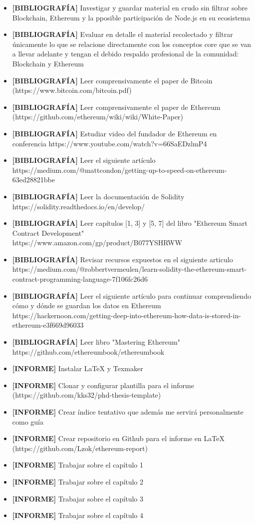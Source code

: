 \begin{itemize}
\item \textbf{[BIBLIOGRAFÍA]} Investigar y guardar material en crudo sin filtrar sobre Blockchain, Ethereum y la pposible participación de Node.js en su ecosistema
\item \textbf{[BIBLIOGRAFÍA]} Evaluar en detalle el material recolectado y filtrar únicamente lo
que se relacione directamente con los conceptos core que se van a llevar adelante y tengan el
debido respaldo profesional de la comunidad: Blockchain y Ethereum
\item \textbf{[BIBLIOGRAFÍA]} Leer comprensivamente el paper de Bitcoin 
(https://www.bitcoin.com/bitcoin.pdf)
\item \textbf{[BIBLIOGRAFÍA]} Leer comprensivamente el paper de Ethereum 
(https://github.com/ethereum/wiki/wiki/White-Paper)
\item \textbf{[BIBLIOGRAFÍA]} Estudiar video del fundador de Ethereum en conferencia 
https://www.youtube.com/watch?v=66SaEDzlmP4
\item \textbf{[BIBLIOGRAFÍA]} Leer el siguiente artículo 
https://medium.com/@mattcondon/getting-up-to-speed-on-ethereum-63ed28821bbe
\item \textbf{[BIBLIOGRAFÍA]} Leer la documentación de Solidity https://solidity.readthedocs.io/en/develop/
\item \textbf{[BIBLIOGRAFÍA]} Leer capítulos [1, 3] y [5, 7] del libro "Ethereum Smart Contract Development" https://www.amazon.com/gp/product/B077YSHRWW
\item \textbf{[BIBLIOGRAFÍA]} Revisar recursos expuestos en el siguiente articulo 
https://medium.com/@robbertvermeulen/learn-solidity-the-ethereum-smart-contract-programming-language-7f106fc26d6
\item \textbf{[BIBLIOGRAFÍA]} Leer el siguiente artículo para continuar comprendiendo cómo y dónde
se guardan los datos en Ethereum https://hackernoon.com/getting-deep-into-ethereum-how-data-is-stored-in-ethereum-e3f669d96033
\item \textbf{[BIBLIOGRAFÍA]} Leer libro "Mastering Ethereum" https://github.com/ethereumbook/ethereumbook

\item \textbf{[INFORME]} Instalar LaTeX y Texmaker
\item \textbf{[INFORME]} Clonar y configurar plantilla para el informe (https://github.com/kks32/phd-thesis-template)
\item \textbf{[INFORME]} Crear índice tentativo que además me servirá personalmente como guía
\item \textbf{[INFORME]} Crear repositorio en Github para el informe en LaTeX (https://github.com/Lzok/ethereum-report)
\item \textbf{[INFORME]} Trabajar sobre el capítulo 1
\item \textbf{[INFORME]} Trabajar sobre el capítulo 2
\item \textbf{[INFORME]} Trabajar sobre el capítulo 3
\item \textbf{[INFORME]} Trabajar sobre el capítulo 4


\end{itemize}
